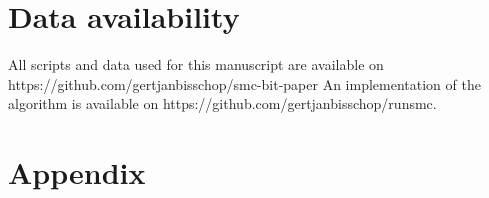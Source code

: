 \documentclass{article}
\newcommand{\tsinfer}[0]{\texttt{tsinfer}}
\newcommand{\argneedle}[0]{\texttt{ARG-Needle}}
\newcommand{\relate}[0]{\texttt{Relate}}
\begin{document}




\section{Data availability}

All scripts and data used for this manuscript are available on https://github.com/gertjanbisschop/smc-bit-paper
An implementation of the algorithm is available on https://github.com/gertjanbisschop/runsmc.
\FloatBarrier



\setcounter{secnumdepth}{2} %

\section*{Appendix}
\appendix

\setcounter{table}{0}
\setcounter{figure}{0}
\renewcommand{\thetable}{A\arabic{table}}
\renewcommand{\thefigure}{A\arabic{figure}}

\end{document}

